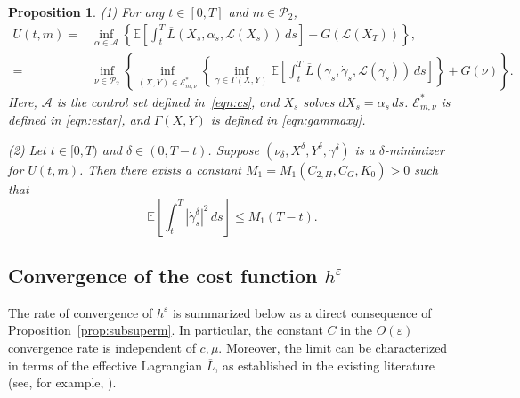 \documentclass[reqno,11pt]{amsart}
\newtheorem{proposition}[theorem]{Proposition}
\numberwithin{equation}{section}
\newcommand{\e}{\varepsilon}
\newcommand{\nd}{\noindent}
\renewcommand{\bar}{\overline}
\begin{document}
\begin{proposition}\label{prop:Uformula}
(1)  For any $t \in [0, T]$ and $m \in \mathcal{P}_2$,
\[
\begin{aligned}
U(t, m)=&\inf_{\alpha\in\mathcal{A}}\left\{\mathbb{E}\left[\int^T_t \bar{L}\left(X_s,\alpha_s, \mathcal{L}(X_s) \right)\, ds \right]+G(\mathcal{L}(X_T))\right\},\\
=&\inf_{\nu\in \mathcal{P}_2}\left\{\inf_{(X,Y)\in\mathcal{E}^\ast_{m,\nu}}\left\{\inf_{\gamma\in\Gamma(X,Y)}\mathbb{E}\left[\int^T_t\bar{L}\left(\gamma_s, \dot{\gamma}_s,\mathcal{L}(\gamma_s)\right) \, ds\right]\right\}+G(\nu)\right\}.
\end{aligned}
\]
Here, $\mathcal{A}$ is the control set defined in~\eqref{eqn:cs}, and $X_s$ solves $dX_s=\alpha_s\,ds$. $\mathcal{E}_{m,\nu}^\ast$ is defined in \eqref{eqn:estar}, and $\Gamma(X,Y)$ is defined in \eqref{eqn:gammaxy}.

\nd
(2) Let $t \in [0, T)$ and $\delta \in \left(0, T-t\right)$. Suppose $(\nu_\delta,X^\delta, Y^\delta,\gamma^\delta)$ is a $\delta$-minimizer for $U(t,m)$.
Then there exists a constant $M_1=M_1(C_{2, H}, C_G, K_0)>0$ such that
\[
    \mathbb{E} \left[\int_{t}^T\left|\dot{\gamma}^\delta_s\right|^2\,ds\right] \leq M_1(T-t).
\]
\end{proposition}

\subsection{Convergence of the cost function $h^\e$}
The rate of convergence of $h^\e$ is summarized below as a direct consequence of Proposition~\ref{prop:subsuperm}. In particular, the constant $C$ in the $O(\varepsilon)$ convergence rate is independent of $c, \mu$. Moreover, the limit can be characterized in terms of the effective Lagrangian $\bar{L}$, as established in the existing literature (see, for example, \cite{LionsPapaVara1987,Weinan1991}).
\end{document}
